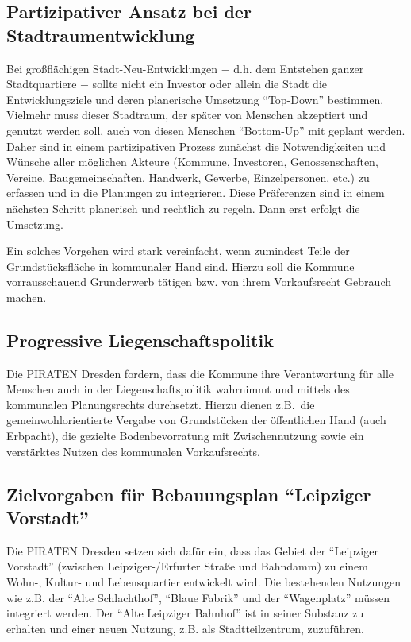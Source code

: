 \documentclass[a4paper, 11pt]{article}
\begin{document}
\subsection{Partizipativer Ansatz bei der Stadtraumentwicklung}
Bei großflächigen Stadt-Neu-Entwicklungen $-$ d.h. dem Entstehen ganzer Stadtquartiere $-$ sollte nicht ein Investor oder allein die Stadt die Entwicklungsziele und deren planerische Umsetzung ``Top-Down'' bestimmen. Vielmehr muss dieser Stadtraum, der später von Menschen akzeptiert und genutzt werden soll, auch von diesen Menschen ``Bottom-Up'' mit geplant werden. Daher sind in einem partizipativen Prozess zunächst die Notwendigkeiten und Wünsche aller möglichen Akteure (Kommune, Investoren, Genossenschaften, Vereine, Baugemeinschaften, Handwerk, Gewerbe, Einzelpersonen, etc.) zu erfassen und in die Planungen zu integrieren. Diese Präferenzen sind in einem nächsten Schritt planerisch und rechtlich zu regeln. Dann erst erfolgt die Umsetzung.\newline

Ein solches Vorgehen wird stark vereinfacht, wenn zumindest Teile der Grundstücksfläche in kommunaler Hand sind. Hierzu soll die Kommune vorrausschauend Grunderwerb tätigen bzw. von ihrem Vorkaufsrecht Gebrauch machen.


\subsection{Progressive Liegenschaftspolitik}
Die PIRATEN Dresden fordern, dass die Kommune ihre Verantwortung für alle Menschen auch in der Liegenschaftspolitik wahrnimmt und mittels des kommunalen Planungsrechts durchsetzt. Hierzu dienen z.B.~die gemeinwohlorientierte Vergabe von Grundstücken der öffentlichen Hand (auch Erbpacht), die gezielte Bodenbevorratung mit Zwischennutzung sowie ein verstärktes Nutzen des kommunalen Vorkaufsrechts.


\subsection{Zielvorgaben für Bebauungsplan ``Leipziger Vorstadt''}
Die PIRATEN Dresden setzen sich dafür ein, dass das Gebiet der ``Leipziger Vorstadt'' (zwischen Leipziger-/Erfurter Straße und Bahndamm) zu einem Wohn-, Kultur- und Lebensquartier entwickelt wird. Die bestehenden Nutzungen wie z.B. der ``Alte Schlachthof'', ``Blaue Fabrik'' und der ``Wagenplatz'' müssen integriert werden. Der ``Alte Leipziger Bahnhof'' ist in seiner Substanz zu erhalten und einer neuen Nutzung, z.B. als Stadtteilzentrum, zuzuführen.\newline
\end{document}
